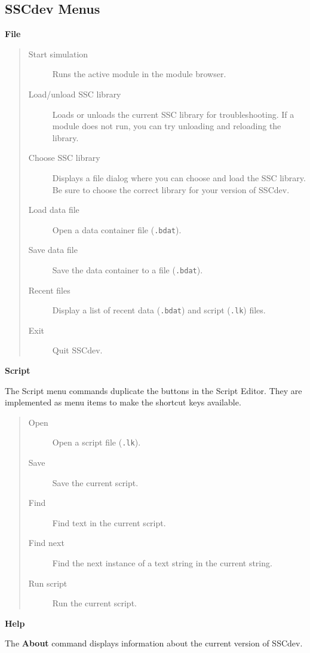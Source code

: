 \documentclass{article}
\begin{document}
\subsection{SSCdev Menus}
\label{sec_sscdev_menus}

\textbf{File}
\begin{quote}
\begin{description}
\item[Start simulation] Runs the active module in the module browser.
\item[Load/unload SSC library] Loads or unloads the current SSC library for troubleshooting. If a module does not run, you can try unloading and reloading the library.
\item[Choose SSC library] Displays a file dialog where you can choose and load the SSC library. Be sure to choose the correct library for your version of SSCdev.
\item[Load data file] Open a data container file (\texttt{.bdat}).
\item[Save data file] Save the data container to a file (\texttt{.bdat}).
\item[Recent files] Display a list of recent data (\texttt{.bdat}) and script (\texttt{.lk}) files.
\item[Exit] Quit SSCdev.
\end{description}
\end{quote}

\textbf{Script}

The Script menu commands duplicate the buttons in the Script Editor. They are implemented as menu items to make the shortcut keys available.

\begin{quote}
\begin{description}
\item[Open] Open a script file (\texttt{.lk}).
\item[Save] Save the current script.
\item[Find] Find text in the current script.
\item[Find next] Find the next instance of a text string in the current string.
\item[Run script] Run the current script. 
\end{description}
\end{quote}

\textbf{Help}

The \textbf{About} command displays information about the current version of SSCdev.
\end{document}
